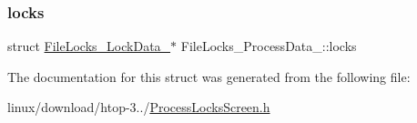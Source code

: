 \subsubsection{\texorpdfstring{locks}{locks}}
{\footnotesize\ttfamily struct \hyperlink{structFileLocks__LockData__}{File\+Locks\+\_\+\+Lock\+Data\+\_\+}$\ast$ File\+Locks\+\_\+\+Process\+Data\+\_\+\+::locks}



The documentation for this struct was generated from the following file\+:\begin{DoxyCompactItemize}
\item 
linux/download/htop-\/3../\hyperlink{ProcessLocksScreen_8h}{Process\+Locks\+Screen.\+h}\end{DoxyCompactItemize}
